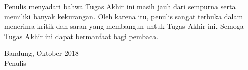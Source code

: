 Penulis menyadari bahwa Tugas Akhir ini masih jauh dari sempurna serta memiliki banyak kekurangan. Oleh karena itu, penulis sangat terbuka dalam menerima kritik dan saran yang membangun untuk Tugas Akhir ini. Semoga Tugas Akhir ini dapat bermanfaat bagi pembaca.

\begin{flushright}
Bandung, Oktober 2018 \\
\vspace{25mm}
Penulis
\end{flushright}

